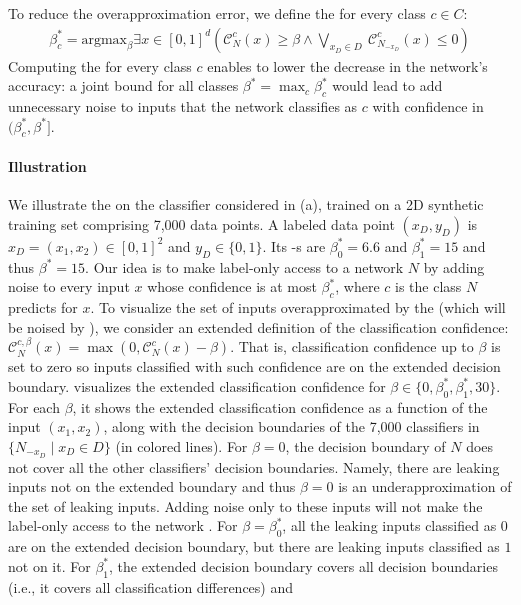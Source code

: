 To reduce the overapproximation error, we define the \propa for every class $c\in C$:
\begin{align}\label{dpdbc}
\beta^*_c=\text{argmax}_\beta \exists x \in [0,1]^d
\left( 
\mathcal{C}_{N}^c(x) \geq \beta \land \bigvee_{ x_D \in D}\ \mathcal{C}_{N_{-x_D}}^c(x) \leq 0\right )
\end{align}
Computing the \propa for every class $c$ enables \tool to lower the decrease in the network's accuracy: a joint bound for all classes $\beta^*=\max_c \beta^*_c$ would lead \tool to add unnecessary noise to inputs that the network classifies as $c$ with confidence 
in $(\beta_c^*,\beta^*]$.


\paragraph{Illustration}
We illustrate the \propa on the classifier considered in (a),
trained on a 2D synthetic training set comprising 7,000 data points. A labeled data point $(x_D,y_D)$ is $x_D=(x_1,x_2)\in [0,1]^2$ and $y_D\in \{0,1\}$. 
Its \propa-s are $\beta_0^*=6.6$ and $\beta_1^*=15$ and thus $\beta^*=15$.
Our idea is to make label-only access to a network $N$ \propi by adding noise to every input $x$ whose confidence is at most $\beta^*_c$, where $c$ is the class $N$ predicts for $x$.
To visualize the set of inputs overapproximated by the \propa (which will be noised by \tool), we consider an extended definition of the classification confidence: $\mathcal{C}^{c,\beta}_{N}(x) = \max(0, \mathcal{C}_{N}^c(x) - \beta)$. That is, classification confidence up to $\beta$ is set to zero so inputs classified with such confidence are on the extended decision boundary. 
 visualizes the extended classification confidence for $\beta\in\{0, \beta_0^*, \beta_1^*, 30\}$. For each $\beta$, it shows the extended classification confidence as a function of the input $(x_1,x_2)$, along with the decision boundaries of the 7,000 classifiers in $\{N_{-x_D}\mid x_D \in D \}$ (in colored lines). For $\beta=0$, the decision boundary of $N$ does not cover all the other classifiers' decision boundaries. Namely, there are leaking inputs not on the extended boundary and thus $\beta=0$ is an underapproximation of the set of leaking inputs. Adding noise only to these inputs will not make the label-only access to the network \propi. For $\beta=\beta_0^*$, all the leaking inputs classified as $0$ are on the extended decision boundary, but there are leaking inputs classified as $1$ not on it. For $\beta_1^*$, the extended decision boundary covers all decision boundaries (i.e., it covers all classification differences) and 
